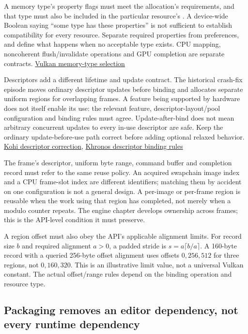 A memory type's property flags must meet the allocation's requirements, and that type must also be included in the particular resource's . A device-wide Boolean saying ``some type has these properties'' is not sufficient to establish compatibility for every resource. Separate required properties from preferences, and define what happens when no acceptable type exists. CPU mapping, noncoherent flush/invalidate operations and GPU completion are separate contracts. \href{https://docs.vulkan.org/spec/latest/chapters/memory.html}{Vulkan memory-type selection}

Descriptors add a different lifetime and update contract. The historical crash-fix episode moves ordinary descriptor updates before binding and allocates separate uniform regions for overlapping frames. A feature being supported by hardware does not itself enable its use: the relevant feature, descriptor-layout/pool configuration and binding rules must agree. Update-after-bind does not mean arbitrary concurrent updates to every in-use descriptor are safe. Keep the ordinary update-before-use path correct before adding optional relaxed behavior. \href{https://www.youtube.com/watch?v=U4QvUeUL37Y}{Kohi descriptor correction}, \href{https://docs.vulkan.org/spec/latest/chapters/descriptorsets.html}{Khronos descriptor binding rules}

The frame's descriptor, uniform byte range, command buffer and completion record must refer to the same reuse policy. An acquired swapchain image index and a CPU frame-slot index are different identifiers; matching them by accident on one configuration is not a general design. A per-image or per-frame region is reusable when the work using that region has completed, not merely when a modulo counter repeats. The engine chapter develops ownership across frames; this is the API-level condition it must preserve.

A region offset must also obey the API's applicable alignment limits. For record size \(b\) and required alignment \(a>0\), a padded stride is \(s=a\lceil b/a\rceil\). A 160-byte record with a queried 256-byte offset alignment uses offsets \(0,256,512\) for three regions, not \(0,160,320\). This is an illustrative limit value, not a universal Vulkan constant. The actual offset/range rules depend on the binding operation and resource type.

\subsection{Packaging removes an editor dependency, not every runtime dependency}\label{05-engine-i-ch008-packaging-removes-an-editor-dependency-not-every-runtime-dependency}

